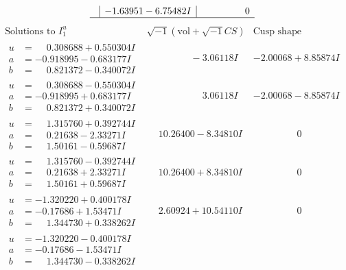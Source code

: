 \documentclass[1p]{elsarticle_modified}
\theoremstyle{definition}
\newcommand{\I}{\sqrt{-1}}
\begin{document}
$$\begin{array}{c|c|c}
 & -1.63951 - 6.75482 I & \phantom{-0.000000 } 0\\
 \hline 
 \end{array}$$\newpage$$\begin{array}{c|c|c}  
\text{Solutions to }I^u_{1}& \I (\text{vol} + \sqrt{-1}CS) & \text{Cusp shape}\\
 \hline 
\begin{aligned}
u &= \phantom{-}0.308688 + 0.550304 I \\
a &= -0.918995 - 0.683177 I \\
b &= \phantom{-}0.821372 - 0.340072 I\end{aligned}
 & \phantom{-0.000000 } -3.06118 I & -2.00068 + 8.85874 I \\ \hline\begin{aligned}
u &= \phantom{-}0.308688 - 0.550304 I \\
a &= -0.918995 + 0.683177 I \\
b &= \phantom{-}0.821372 + 0.340072 I\end{aligned}
 & \phantom{-0.000000 -}3.06118 I & -2.00068 - 8.85874 I \\ \hline\begin{aligned}
u &= \phantom{-}1.315760 + 0.392744 I \\
a &= \phantom{-}0.21638 - 2.33271 I \\
b &= \phantom{-}1.50161 - 0.59687 I\end{aligned}
 & \phantom{-}10.26400 - 8.34810 I & \phantom{-0.000000 } 0 \\ \hline\begin{aligned}
u &= \phantom{-}1.315760 - 0.392744 I \\
a &= \phantom{-}0.21638 + 2.33271 I \\
b &= \phantom{-}1.50161 + 0.59687 I\end{aligned}
 & \phantom{-}10.26400 + 8.34810 I & \phantom{-0.000000 } 0 \\ \hline\begin{aligned}
u &= -1.320220 + 0.400178 I \\
a &= -0.17686 + 1.53471 I \\
b &= \phantom{-}1.344730 + 0.338262 I\end{aligned}
 & \phantom{-}2.60924 + 10.54110 I & \phantom{-0.000000 } 0 \\ \hline\begin{aligned}
u &= -1.320220 - 0.400178 I \\
a &= -0.17686 - 1.53471 I \\
b &= \phantom{-}1.344730 - 0.338262 I\end{aligned}

\end{array}$$
\end{document}
